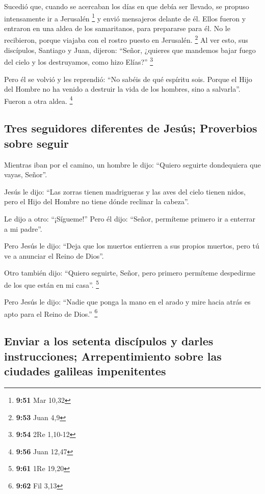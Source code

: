  Sucedió que, cuando se acercaban los días en que debía
ser llevado, se propuso intensamente ir a Jerusalén \footnote{\textbf{9:51}
  Mar 10,32}  y envió mensajeros delante de él. Ellos
fueron y entraron en una aldea de los samaritanos, para prepararse para
él.  No le recibieron, porque viajaba con el rostro
puesto en Jerusalén. \footnote{\textbf{9:53} Juan 4,9} 
Al ver esto, sus discípulos, Santiago y Juan, dijeron: ``Señor, ¿quieres
que mandemos bajar fuego del cielo y los destruyamos, como hizo Elías?''
\footnote{\textbf{9:54} 2Re 1,10-12}

 Pero él se volvió y les reprendió: ``No sabéis de qué
espíritu sois.  Porque el Hijo del Hombre no ha venido a
destruir la vida de los hombres, sino a salvarla''. Fueron a otra aldea.
\footnote{\textbf{9:56} Juan 12,47}

\hypertarget{tres-seguidores-diferentes-de-jesuxfas-proverbios-sobre-seguir}{%
\subsection{Tres seguidores diferentes de Jesús; Proverbios sobre
seguir}\label{tres-seguidores-diferentes-de-jesuxfas-proverbios-sobre-seguir}}

 Mientras iban por el camino, un hombre le dijo: ``Quiero
seguirte dondequiera que vayas, Señor''.

 Jesús le dijo: ``Las zorras tienen madrigueras y las
aves del cielo tienen nidos, pero el Hijo del Hombre no tiene dónde
reclinar la cabeza''.

 Le dijo a otro: ``¡Sígueme!'' Pero él dijo: ``Señor,
permíteme primero ir a enterrar a mi padre''.

 Pero Jesús le dijo: ``Deja que los muertos entierren a
sus propios muertos, pero tú ve a anunciar el Reino de Dios''.

 Otro también dijo: ``Quiero seguirte, Señor, pero
primero permíteme despedirme de los que están en mi casa''. \footnote{\textbf{9:61}
  1Re 19,20}

 Pero Jesús le dijo: ``Nadie que ponga la mano en el
arado y mire hacia atrás es apto para el Reino de Dios.'' \footnote{\textbf{9:62}
  Fil 3,13}

\hypertarget{enviar-a-los-setenta-discuxedpulos-y-darles-instrucciones-arrepentimiento-sobre-las-ciudades-galileas-impenitentes}{%
\subsection{Enviar a los setenta discípulos y darles instrucciones;
Arrepentimiento sobre las ciudades galileas
impenitentes}\label{enviar-a-los-setenta-discuxedpulos-y-darles-instrucciones-arrepentimiento-sobre-las-ciudades-galileas-impenitentes}}


